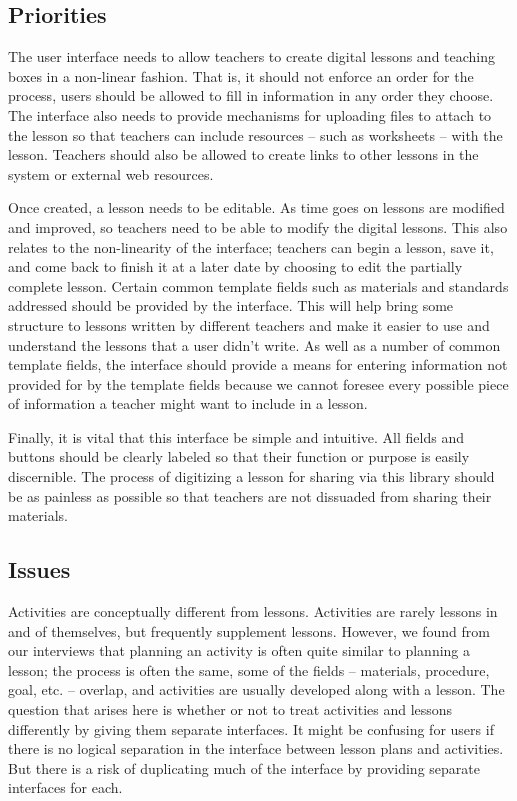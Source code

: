 \documentclass[10pt,letter]{article}
\begin{document}
\subsection{Priorities}
The user interface needs to allow teachers to create digital lessons and
teaching boxes in a non-linear fashion. That is, it should not enforce an order
for the process, users should be allowed to fill in information in any order
they choose. The interface also needs to provide mechanisms for uploading files
to attach to the lesson so that teachers can include resources -- such as
worksheets -- with the lesson. Teachers should also be allowed to create links
to other lessons in the system or external web resources.

Once created, a lesson needs to be editable. As time goes on lessons are
modified and improved, so teachers need to be able to modify the digital
lessons. This also relates to the non-linearity of the interface; teachers can
begin a lesson, save it, and come back to finish it at a later date by choosing
to edit the partially complete lesson. Certain common template fields such as
materials and standards addressed should be provided by the interface. This will
help bring some structure to lessons written by different teachers and make it
easier to use and understand the lessons that a user didn't write. As well as
a number of common template fields, the interface should provide a means for
entering information not provided for by the template fields because we cannot
foresee every possible piece of information a teacher might want to include in a
lesson.

Finally, it is vital that this interface be simple and intuitive. All fields and
buttons should be clearly labeled so that their function or purpose is easily
discernible. The process of digitizing a lesson for sharing via this library
should be as painless as possible so that teachers are not dissuaded from
sharing their materials.

\subsection{Issues}
\label{sec: issues}
Activities are conceptually different from lessons. Activities are rarely
lessons in and of themselves, but frequently supplement lessons. However,
we found from our interviews that planning an activity is often quite similar to
planning a lesson; the process is often the same, some of the fields --
materials, procedure, goal, etc. -- overlap, and activities are usually
developed along with a lesson. The question that arises here is whether or not
to treat activities and lessons differently by giving them separate interfaces.
It might be confusing for users if there is no logical separation in the
interface between lesson plans and activities. But there is a risk of
duplicating much of the interface by providing separate interfaces for each.
\end{document}
